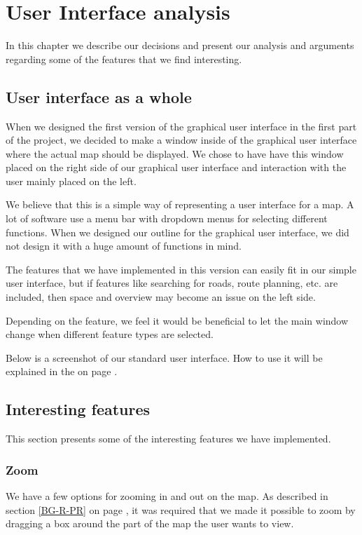\chapter{User Interface analysis}
\label{UIA}
In this chapter we describe our decisions and present our analysis and
arguments regarding some of the features that we find interesting.

\section{User interface as a whole}
\label{UIA-UIW}
When we designed the first version of the graphical user interface in the first
part of the project, we decided to make a window inside of the graphical user
interface where the actual map should be displayed. We chose to have have this
window placed on the right side of our graphical user interface and interaction
with the user mainly placed on the left.

We believe that this is a simple way of representing a user interface for a map.
A lot of software use a menu bar with dropdown menus for selecting different
functions. When we designed our outline for the graphical user interface, we did
not design it with a huge amount of functions in mind. 

The features that we have implemented in this version can easily fit in our
simple user interface, but if features like searching for roads, route planning,
etc. are included, then space and overview may become an issue on the left side.

Depending on the feature, we feel it would be beneficial to let the main window
change when different feature types are selected.

Below is a screenshot of our standard user interface. How to use it will be
explained in the  on page \pageref{MAN}.
\section{Interesting features}
\label{UIA-IF}
This section presents some of the interesting features we have implemented.
\subsection{Zoom}
\label{UIA-IF-Z}
We have a few options for zooming in and out on the map. As described in
section \ref{BG-R-PR}  on page \pageref{BG-R-PR}, it
was required that we made it possible to zoom by dragging a box around the part of the map the user wants to
view.

